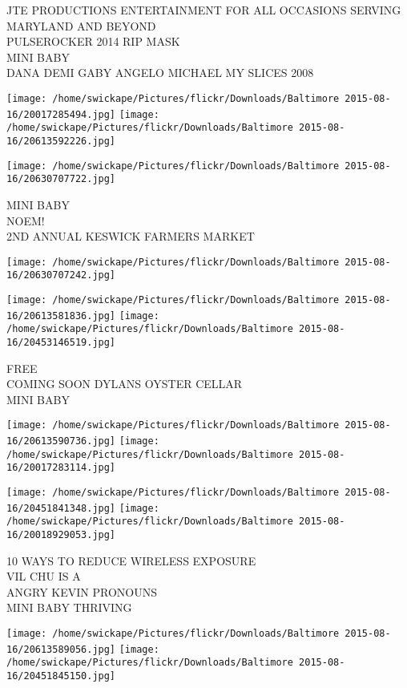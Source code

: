 \documentclass[10pt,letterpaper]{article}
\begin{document}
JTE PRODUCTIONS ENTERTAINMENT FOR ALL OCCASIONS SERVING MARYLAND AND BEYOND\\
PULSEROCKER 2014 RIP MASK\\
MINI BABY\\
DANA DEMI GABY ANGELO MICHAEL MY SLICES 2008
\pagebreak

\texttt{[image: /home/swickape/Pictures/flickr/Downloads/Baltimore 2015-08-16/20017285494.jpg]}
\texttt{[image: /home/swickape/Pictures/flickr/Downloads/Baltimore 2015-08-16/20613592226.jpg]}

\texttt{[image: /home/swickape/Pictures/flickr/Downloads/Baltimore 2015-08-16/20630707722.jpg]}

MINI BABY\\
NOEM!\\
2ND ANNUAL KESWICK FARMERS MARKET
\pagebreak

\texttt{[image: /home/swickape/Pictures/flickr/Downloads/Baltimore 2015-08-16/20630707242.jpg]}

\vspace{0.25in}
\texttt{[image: /home/swickape/Pictures/flickr/Downloads/Baltimore 2015-08-16/20613581836.jpg]}
\texttt{[image: /home/swickape/Pictures/flickr/Downloads/Baltimore 2015-08-16/20453146519.jpg]}

FREE\\
COMING SOON DYLANS OYSTER CELLAR\\
MINI BABY
\pagebreak

\texttt{[image: /home/swickape/Pictures/flickr/Downloads/Baltimore 2015-08-16/20613590736.jpg]}
\texttt{[image: /home/swickape/Pictures/flickr/Downloads/Baltimore 2015-08-16/20017283114.jpg]}

\texttt{[image: /home/swickape/Pictures/flickr/Downloads/Baltimore 2015-08-16/20451841348.jpg]}
\texttt{[image: /home/swickape/Pictures/flickr/Downloads/Baltimore 2015-08-16/20018929053.jpg]}

10 WAYS TO REDUCE WIRELESS EXPOSURE\\
VIL CHU IS A\\
ANGRY KEVIN PRONOUNS\\
MINI BABY THRIVING
\pagebreak

\texttt{[image: /home/swickape/Pictures/flickr/Downloads/Baltimore 2015-08-16/20613589056.jpg]}
\texttt{[image: /home/swickape/Pictures/flickr/Downloads/Baltimore 2015-08-16/20451845150.jpg]}
\end{document}

